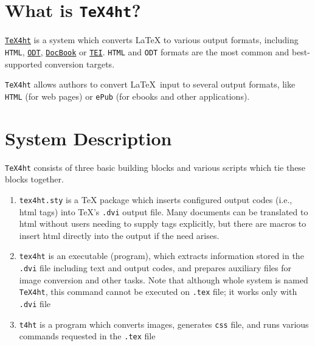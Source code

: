 \hypertarget{what-is-tex4ht}{%
\section{\texorpdfstring{What is
\texttt{TeX4ht}?}{What is TeX4ht?}}\label{what-is-tex4ht}}

\href{https://www.tug.org/tex4ht/}{\texttt{TeX4ht}} is a system which
converts LaTeX to various output formats, including \texttt{HTML},
\href{http://en.wikipedia.org/wiki/OpenDocument}{\texttt{ODT}},
\href{http://en.wikipedia.org/wiki/DocBook}{\texttt{DocBook}} or
\href{http://en.wikipedia.org/wiki/Text_Encoding_Initiative}{\texttt{TEI}}.
\texttt{HTML} and \texttt{ODT} formats are the most common and best-supported
conversion targets.

\texttt{TeX4ht} allows authors to convert \LaTeX\ input to 
several output formats, like  \texttt{HTML} (for web pages) or
\texttt{ePub} (for ebooks and other applications).

\hypertarget{system-description}{%
\section{System Description}\label{system-description}}

\texttt{TeX4ht} consists of three basic building blocks and various
scripts which tie these blocks together.

\begin{enumerate}
\def\labelenumi{\arabic{enumi}.}
\item
  \texttt{tex4ht.sty} is a TeX package which inserts configured output
  codes (i.e., html tags) into TeX's \texttt{.dvi} output file. Many
  documents can be translated to html without users needing to supply
  tags explicitly, but there are macros to insert html directly into the
  output if the need arises.
\item
  \texttt{tex4ht} is an executable (program), which extracts information
  stored in the \texttt{.dvi} file including text and output codes, and
  prepares auxiliary files for image conversion and other tasks. Note
  that although whole system is named \texttt{TeX4ht}, this command
  cannot be executed on \texttt{.tex} file; it works only with
  \texttt{.dvi} file
\item
  \texttt{t4ht} is a program which converts images, generates
  \texttt{css} file, and runs various commands requested in the
  \texttt{.tex} file
\end{enumerate}

